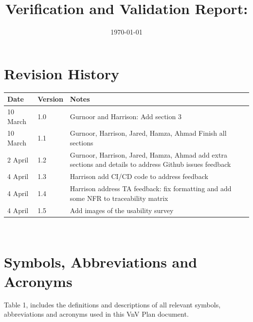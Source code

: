 \documentclass[12pt, titlepage]{article}
\begin{document}
\title{Verification and Validation Report: \progname} 
\author{\authname}
\date{\today}
	
\maketitle


\section{Revision History}

\begin{tabularx}{\textwidth}{p{3cm}p{2cm}X}
\toprule {\bf Date} & {\bf Version} & {\bf Notes}\\
\midrule
10 March & 1.0 & Gurnoor and Harrison: Add section 3\\
10 March & 1.1 & Gurnoor, Harrison, Jared, Hamza, Ahmad Finish all sections\\
2 April & 1.2 & Gurnoor, Harrison, Jared, Hamza, Ahmad add extra sections and details to address Github issues feedback\\
4 April & 1.3 & Harrison add CI/CD code to address feedback \\
4 April & 1.4 & Harrison address TA feedback: fix formatting and add some NFR to traceability matrix\\
4 April & 1.5 & Add images of the usability survey\\
\bottomrule
\end{tabularx}

~\newpage

\section{Symbols, Abbreviations and Acronyms}

Table 1, includes the definitions and descriptions of all relevant symbols,
abbreviations and acronyms used in this VnV Plan document.
\end{document}
